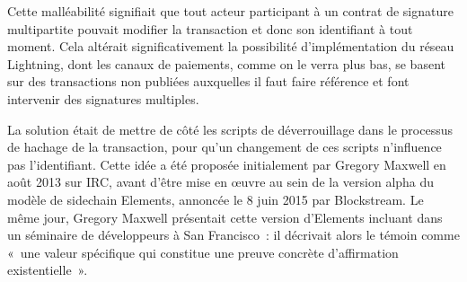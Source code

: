 Cette malléabilité signifiait que tout acteur participant à un contrat de signature multipartite pouvait modifier la transaction et donc son identifiant à tout moment. Cela altérait significativement la possibilité d'implémentation du réseau Lightning, dont les canaux de paiements, comme on le verra plus bas, se basent sur des transactions non publiées auxquelles il faut faire référence et font intervenir des signatures multiples.

La solution était de mettre de côté les scripts de déverrouillage dans le processus de hachage de la transaction, pour qu'un changement de ces scripts n'influence pas l'identifiant. Cette idée a été proposée initialement par Gregory Maxwell en août 2013 sur IRC, avant d'être mise en œuvre au sein de la version alpha du modèle de sidechain Elements, annoncée le 8 juin 2015 par Blockstream. Le même jour, Gregory Maxwell présentait cette version d'Elements incluant  dans un séminaire de développeurs à San Francisco~: il décrivait alors le témoin comme «~une valeur spécifique qui constitue une preuve concrète d'affirmation existentielle~». %


